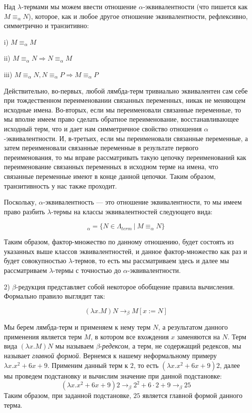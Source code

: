 \documentclass[a4paper]{article}
\begin{document}
Над $\lambda$-термами мы можем ввести отношение $\alpha$-эквивалентности (что пишется как $M \equiv_{\alpha} N$), которое, как и любое другое отношение эквивалентности,
рефлексивно, симметрично и транзитивно:

i) $M \equiv_{\alpha} M$

ii) $M \equiv_{\alpha} N \Rightarrow N \equiv_{\alpha} M$

iii) $M \equiv_{\alpha} N, N \equiv_{\alpha} P \Rightarrow M \equiv_{\alpha} P$

Действительно, во-первых, любой лямбда-терм тривиально эквивалентен сам себе при
тождественном переименовании связанных переменных, никак не меняющем исходные имена. Во-вторых, если мы переименовали связанные переменные,
то мы вполне имеем право сделать обратное переименование, восстанавливающее исходный терм, что и дает нам симметричное свойство
отношения $\alpha$-эквивалентности. И, в-третьих, если мы переименовали связанные переменные, а затем переименовали связанные
переменные в результате первого переименования, то мы вправе рассматривать такую цепочку переименований как переименование связанных переменных в
исходном терме на имена, что связанные переменные имеют в конце данной цепочки. Таким образом, транзитивность у нас также проходит.

Поскольку, $\alpha$-эквивалентность --- это отношение эквивалентности, то мы имеем право разбить $\lambda$-термы на классы эквивалентностей следующего вида:

\begin{equation}
[M]_{\alpha} = \{ N \in \Lambda_{term} \: | \: M \equiv_{\alpha} N \}
\end{equation}

Таким образом, фактор-множество по данному отношению, будет состоять из указанных выше классов эквивалентностей, и данное фактор-множество как
раз и будет совокупностью $\lambda$-термов, то есть мы рассматриваем здесь и далее мы рассматриваем $\lambda$-термы с точностью до $\alpha$-эквивалентности.

2) $\beta$-редукция представляет собой некоторое обобщение правила вычисления. Формально правило выглядит так:

\begin{equation}
(\lambda x. M) N \rightarrow_{\beta} M[x := N]
\end{equation}

Мы берем лямбда-терм и применяем к нему терм $N$, а результатом данного применения является терм $M$, в котором все вхождения $x$ заменяются на $N$.
Терм вида $(\lambda x. M) N$ мы называем $\beta$-\emph{редексом}, а терм, не содержащий редексов, мы называет \emph{главной формой}.
Вернемся к нашему неформальному примеру $\lambda x.x^2 + 6x + 9$. Применим данный терм к $2$, то есть $(\lambda x.x^2 + 6x + 9) 2$, далее мы проведем подстановку и вычислим значение
при данной подстановке:
\begin{equation}
(\lambda x.x^2 + 6x + 9) 2 \rightarrow_{\beta} 2^2 + 6 \cdot 2 + 9 \rightarrow_{\beta} 25
\end{equation}
Таким образом, при заданной подстановке, $25$ является главной формой данного терма.
\end{document}
